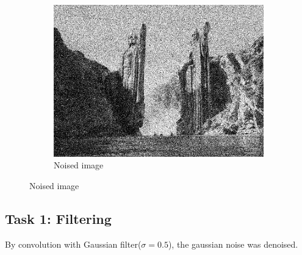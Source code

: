 \documentclass[paper=a4, fontsize=11pt]{scrartcl} %
\numberwithin{equation}{section} %
\numberwithin{figure}{section} %
\numberwithin{table}{section} %
\begin{document}
\begin{figure}[H]
\begin{subfigure}[b]{0.3\textwidth}
		\includegraphics[width=\textwidth]{noisy_image.jpg}
		\caption{Noised image}
	\end{subfigure}
\end{figure}


\subsection{Task 1: Filtering}

By convolution with Gaussian filter($\sigma = 0.5$), the gaussian noise was denoised. 
\end{document}
